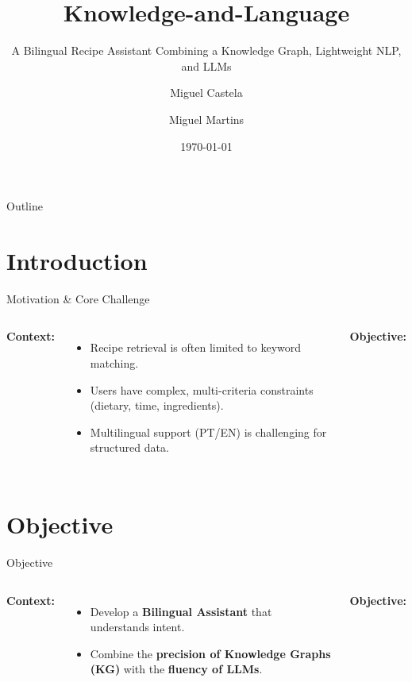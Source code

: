 \documentclass[t, 10pt, handout, aspectratio=169]{beamer}
\title[Knowledge-and-Language]{Knowledge-and-Language}
\subtitle{A Bilingual Recipe Assistant Combining a Knowledge Graph, Lightweight NLP, and LLMs}
\author[M. Castela, M. Martins]{Miguel Castela \and Miguel Martins}
\institute[UC]{University of Coimbra \\ Department of Informatics Engineering}
\date{\today}
\begin{document}
\begin{frame}
  \titlepage
\end{frame}

\begin{frame}{Outline}
  \tableofcontents
\end{frame}

\section{Introduction}
\begin{frame}{Motivation \& Core Challenge}
  \begin{columns}
      \textbf{Context:}
      \begin{itemize}
        \item Recipe retrieval is often limited to keyword matching.
        \item Users have complex, multi-criteria constraints (dietary, time, ingredients).
        \item Multilingual support (PT/EN) is challenging for structured data.
      \end{itemize}
      
      \vspace{1em}
      \textbf{Objective:}
  \end{columns}
\end{frame}


\section{Objective}
\begin{frame}{Objective}
  \begin{columns}
      \textbf{Context:}
      \begin{itemize}
        \item Develop a \textbf{Bilingual Assistant} that understands intent.
        \item Combine the \textbf{precision of Knowledge Graphs (KG)} with the \textbf{fluency of LLMs}.
      \end{itemize}
      
      \vspace{1em}
      \textbf{Objective:}
  \end{columns}
\end{frame}

\end{document}
